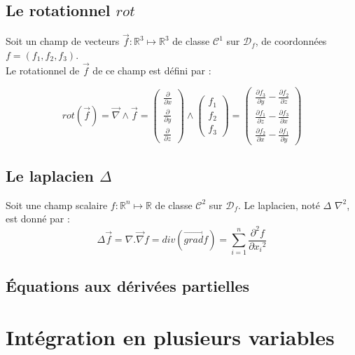 \section{Le rotationnel $rot$}
\begin{defi}
Soit un champ de vecteurs $\overrightarrow{f}:\mathbb{R}^3\mapsto\mathbb{R}^3$ de classe $\mathscr{C}^1$ sur $\mathscr{D}_f$, de coordonnées\\ $f=(f_1,f_2,f_3)$.\\
Le rotationnel de $\overrightarrow{f}$ de ce champ est défini par :

$$rot(\overrightarrow{f})=\overrightarrow{\nabla}\land\overrightarrow{f}=\begin{pmatrix}\frac{\partial}{\partial x}\\\frac{\partial}{\partial y}\\\frac{\partial}{\partial z}\end{pmatrix}\land\begin{pmatrix}f_1\\f_2\\f_3\end{pmatrix}=\begin{pmatrix}\frac{\partial f_3}{\partial y}-\frac{\partial f_2}{\partial z}\\\frac{\partial f_1}{\partial z}-\frac{\partial f_3}{\partial x}\\\frac{\partial f_2}{\partial x}-\frac{\partial f_1}{\partial y}\end{pmatrix}$$
\end{defi}

\section{Le laplacien $\Delta$}
\begin{defi}
Soit une champ scalaire $f:\mathbb{R}^n\mapsto\mathbb{R}$ de classe $\mathscr{C}^2$ sur $\mathscr{D}_f$.
Le laplacien, noté $\Delta$ $\nabla^2$, est donné par :
$$\Delta \overrightarrow{f}=\nabla . \overrightarrow{\nabla} f = div(\overrightarrow{grad}f)=\sum_{i=1}^n \frac{\partial^2 f}{\partial {x_i}^2}$$
\end{defi}
\section{Équations aux dérivées partielles}
\chapter{Intégration en plusieurs variables}
